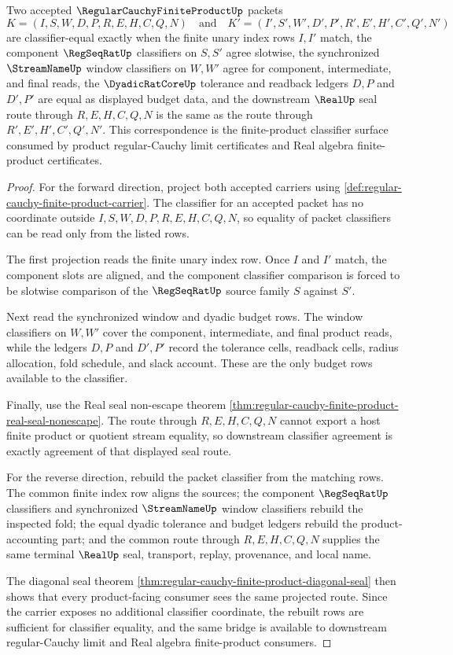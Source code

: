 \begin{theorem}
\label{thm:regular-cauchy-finite-product-classifier-bridge}
Two accepted $\RegularCauchyFiniteProductUp$ packets
$$
K=(I,S,W,D,P,R,E,H,C,Q,N)
\quad\text{and}\quad
K'=(I',S',W',D',P',R',E',H',C',Q',N')
$$
are classifier-equal exactly when the finite unary index rows $I,I'$ match, the component $\RegSeqRatUp$ classifiers on $S,S'$ agree slotwise, the synchronized $\StreamNameUp$ window classifiers on $W,W'$ agree for component, intermediate, and final reads, the $\DyadicRatCoreUp$ tolerance and readback ledgers $D,P$ and $D',P'$ are equal as displayed budget data, and the downstream $\RealUp$ seal route through $R,E,H,C,Q,N$ is the same as the route through $R',E',H',C',Q',N'$. This correspondence is the finite-product classifier surface consumed by product regular-Cauchy limit certificates and Real algebra finite-product certificates.
\end{theorem}
\begin{proof}
For the forward direction, project both accepted carriers using \autoref{def:regular-cauchy-finite-product-carrier}. The classifier for an accepted packet has no coordinate outside $I,S,W,D,P,R,E,H,C,Q,N$, so equality of packet classifiers can be read only from the listed rows.

The first projection reads the finite unary index row. Once $I$ and $I'$ match, the component slots are aligned, and the component classifier comparison is forced to be slotwise comparison of the $\RegSeqRatUp$ source family $S$ against $S'$.

Next read the synchronized window and dyadic budget rows. The window classifiers on $W,W'$ cover the component, intermediate, and final product reads, while the ledgers $D,P$ and $D',P'$ record the tolerance cells, readback cells, radius allocation, fold schedule, and slack account. These are the only budget rows available to the classifier.

Finally, use the Real seal non-escape theorem \autoref{thm:regular-cauchy-finite-product-real-seal-nonescape}. The route through $R,E,H,C,Q,N$ cannot export a host finite product or quotient stream equality, so downstream classifier agreement is exactly agreement of that displayed seal route.

For the reverse direction, rebuild the packet classifier from the matching rows. The common finite index row aligns the sources; the component $\RegSeqRatUp$ classifiers and synchronized $\StreamNameUp$ window classifiers rebuild the inspected fold; the equal dyadic tolerance and budget ledgers rebuild the product-accounting part; and the common route through $R,E,H,C,Q,N$ supplies the same terminal $\RealUp$ seal, transport, replay, provenance, and local name.

The diagonal seal theorem \autoref{thm:regular-cauchy-finite-product-diagonal-seal} then shows that every product-facing consumer sees the same projected route. Since the carrier exposes no additional classifier coordinate, the rebuilt rows are sufficient for classifier equality, and the same bridge is available to downstream regular-Cauchy limit and Real algebra finite-product consumers.
\end{proof}

